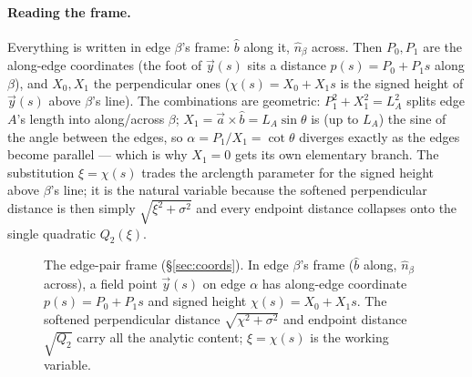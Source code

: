 \documentclass[11pt]{article}
\begin{document}
\paragraph{Reading the frame.}  Everything is written in edge $\beta$'s frame:
$\hat b$ along it, $\hat n_\beta$ across.  Then $P_0,P_1$ are the along-edge
coordinates (the foot of $\vec y(s)$ sits a distance $p(s)=P_0+P_1s$ along $\beta$),
and $X_0,X_1$ the perpendicular ones ($\chi(s)=X_0+X_1s$ is the signed height of
$\vec y(s)$ above $\beta$'s line).  The combinations are geometric: $P_1^2+X_1^2=L_A^2$
splits edge $A$'s length into along/across $\beta$; $X_1=\vec a\times\hat b=L_A\sin\theta$
is (up to $L_A$) the sine of the angle between the edges, so $\alpha=P_1/X_1=\cot\theta$
diverges exactly as the edges become parallel --- which is why $X_1=0$ gets its own
elementary branch.  The substitution $\xi=\chi(s)$ trades the arclength parameter for
the signed height above $\beta$'s line; it is the natural variable because the softened
perpendicular distance is then simply $\sqrt{\xi^2+\sigma^2}$ and every endpoint
distance collapses onto the single quadratic $Q_2(\xi)$.

\begin{figure}[ht]\centering
{}
\caption{The edge-pair frame (\S\ref{sec:coords}).  In edge $\beta$'s frame ($\hat b$
along, $\hat n_\beta$ across), a field point $\vec y(s)$ on edge $\alpha$ has along-edge
coordinate $p(s)=P_0+P_1s$ and signed height $\chi(s)=X_0+X_1s$.  The softened
perpendicular distance $\sqrt{\chi^2+\sigma^2}$ and endpoint distance $\sqrt{Q_2}$
carry all the analytic content; $\xi=\chi(s)$ is the working variable.}
\label{fig:frame}
\end{figure}
\end{document}
